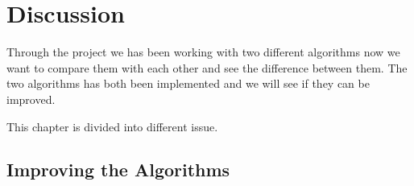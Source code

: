 \chapter{Discussion}

Through the project we has been working with two different algorithms now we want to compare them with each other and see the difference between them. The two algorithms has both been implemented and we will see if they can be improved.  

This chapter is divided into different issue.



\section{Improving the Algorithms}



